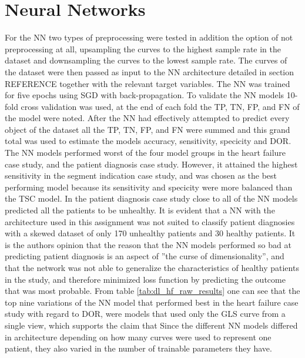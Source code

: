 \section{Neural Networks}

For the NN two types of preprocessing were tested in addition the option of not preprocessing at all, upsampling the curves to the highest sample rate in the dataset and downsampling the curves to the lowest sample rate.
The curves of the dataset were then passed as input to the NN architecture detailed in section REFERENCE together with the relevant target variables.
The NN was trained for five epochs using SGD with back-propagation.
To validate the NN models 10-fold cross validation was used, at the end of each fold the TP, TN, FP, and FN of the model were noted. 
After the NN had effectively attempted to predict every object of the dataset all the TP, TN, FP, and FN were summed and this grand total was used to estimate the models accuracy, sensitivity, specicity and DOR.
The NN models performed worst of the four model groups in the heart failure case study, and the patient diagnosis case study.
However, it attained the highest sensitivity in the segment indication case study, and was chosen as the best performing model because its sensitivity and specicity were more balanced than the TSC model.
In the patient diagnosis case study close to all of the NN models predicted all the patients to be unhealthy. 
It is evident that a NN with the architecture used in this assignment was not suited to classify patient diagnosies with a skewed dataset of only 170 unhealthy patients and 30 healthy patients.
It is the authors opinion that the reason that the NN models performed so bad at predicting patient diagnosis is an aspect of ''the curse of dimensionality'', and that the network was not able to generalize the characteristics of healthy patients in the study, and therefore minimized loss function by predicting the outcome that was most probable.
From table \ref{tab:dl_hf_raw_results} one can see that the top nine variations of the NN model that performed best in the heart failure case study with regard to DOR, were models that used only the GLS curve from a single view, which supports the claim that 
Since the different NN models differed in architecture depending on how many curves were used to represent one patient, they also varied in the number of trainable parameters they have. 
